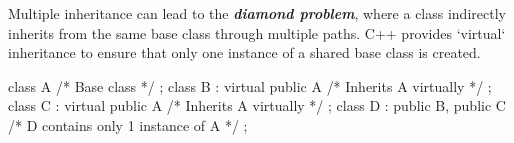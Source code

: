Multiple inheritance can lead to the \textit{\textbf{diamond problem}}, where a class indirectly inherits from the same base class through multiple paths. C++ provides `virtual` inheritance to ensure that only one instance of a shared base class is created.

\begin{codeblock}[language=C++, numbers=none]
class A { /* Base class */ };
class B : virtual public A { /* Inherits A virtually */ };
class C : virtual public A { /* Inherits A virtually */ };
class D : public B, public C { /* D contains only 1 instance of A */ };
\end{codeblock}

